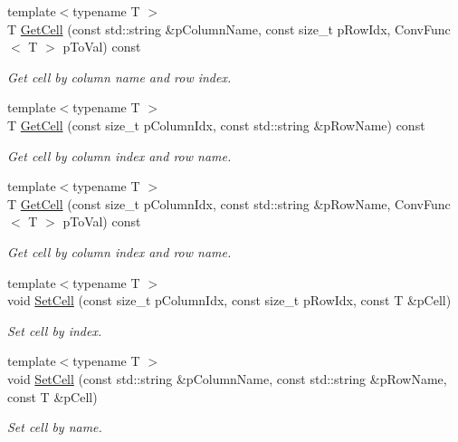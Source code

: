 \begin{DoxyCompactItemize}
{\footnotesize template$<$typename T $>$ }\\T \hyperlink{classrapidcsv_1_1Document_af5af1480a4456347fade6354f7d47d8e}{Get\+Cell} (const std\+::string \&p\+Column\+Name, const size\+\_\+t p\+Row\+Idx, Conv\+Func$<$ T $>$ p\+To\+Val) const
\begin{DoxyCompactList}\small\item\em Get cell by column name and row index. \end{DoxyCompactList}\item 
{\footnotesize template$<$typename T $>$ }\\T \hyperlink{classrapidcsv_1_1Document_a35499f9c2ad3f708449be46e191d8748}{Get\+Cell} (const size\+\_\+t p\+Column\+Idx, const std\+::string \&p\+Row\+Name) const
\begin{DoxyCompactList}\small\item\em Get cell by column index and row name. \end{DoxyCompactList}\item 
{\footnotesize template$<$typename T $>$ }\\T \hyperlink{classrapidcsv_1_1Document_aa0a96f88a453454a5724dd06844e86f2}{Get\+Cell} (const size\+\_\+t p\+Column\+Idx, const std\+::string \&p\+Row\+Name, Conv\+Func$<$ T $>$ p\+To\+Val) const
\begin{DoxyCompactList}\small\item\em Get cell by column index and row name. \end{DoxyCompactList}\item 
{\footnotesize template$<$typename T $>$ }\\void \hyperlink{classrapidcsv_1_1Document_a898aaeab0412ad7de186f669194569f8}{Set\+Cell} (const size\+\_\+t p\+Column\+Idx, const size\+\_\+t p\+Row\+Idx, const T \&p\+Cell)
\begin{DoxyCompactList}\small\item\em Set cell by index. \end{DoxyCompactList}\item 
{\footnotesize template$<$typename T $>$ }\\void \hyperlink{classrapidcsv_1_1Document_ab90e2c413dbdaf29d013d975bf3d1d53}{Set\+Cell} (const std\+::string \&p\+Column\+Name, const std\+::string \&p\+Row\+Name, const T \&p\+Cell)
\begin{DoxyCompactList}\small\item\em Set cell by name. \end{DoxyCompactList}\item 

\end{DoxyCompactItemize}
